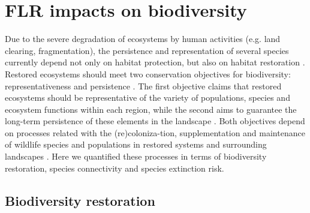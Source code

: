 


\chapter{FLR impacts on biodiversity\label{ch:biodiv}} 

Due to the severe degradation of ecosystems by human activities (e.g. land clearing, fragmentation), the persistence and representation of several species currently depend not only on habitat protection, but also on habitat restoration \citep{Crouzeilles2015}. Restored ecosystems should meet two  conservation objectives for biodiversity: representativeness and persistence \citep{NossReedNielsenScottVance-Borland1982}. The first objective claims that restored ecosystems should be representative of the variety of populations, species and ecosystem functions within each region, while the second aims to guarantee the long-term persistence of these elements in the landscape \citep{Margules2000}. Both objectives depend on processes related with the (re)coloniza-tion, supplementation and maintenance of wildlife species and populations in restored systems and surrounding landscapes \citep{Helmer2008, Crk2009, Crouzeilles2016a}. Here we quantified these processes in terms of biodiversity restoration, species connectivity and species extinction risk. 
%
\section{\Large Biodiversity restoration}\label{sec:bio-recov}
